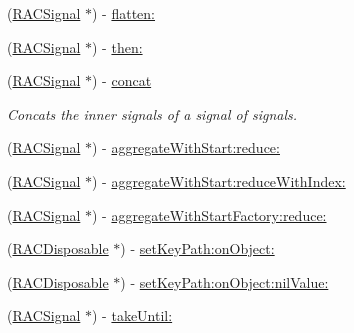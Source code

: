 \begin{DoxyCompactItemize}
\item 
(\mbox{\hyperlink{interface_r_a_c_signal}{R\+A\+C\+Signal}} $\ast$) -\/ \mbox{\hyperlink{category_r_a_c_signal_07_operations_08_a72e5f2fd80960ee5422e08ceef0f4e2c}{flatten\+:}}
\item 
(\mbox{\hyperlink{interface_r_a_c_signal}{R\+A\+C\+Signal}} $\ast$) -\/ \mbox{\hyperlink{category_r_a_c_signal_07_operations_08_aeed35de5a36e70f87721a0ad6ffabecd}{then\+:}}
\item 
\mbox{\label{category_r_a_c_signal_07_operations_08_a68bff1ad76f3dddda45dcf3dc98a1ae2}} 
(\mbox{\hyperlink{interface_r_a_c_signal}{R\+A\+C\+Signal}} $\ast$) -\/ \mbox{\hyperlink{category_r_a_c_signal_07_operations_08_a68bff1ad76f3dddda45dcf3dc98a1ae2}{concat}}
\begin{DoxyCompactList}\small\item\em Concats the inner signals of a signal of signals. \end{DoxyCompactList}\item 
(\mbox{\hyperlink{interface_r_a_c_signal}{R\+A\+C\+Signal}} $\ast$) -\/ \mbox{\hyperlink{category_r_a_c_signal_07_operations_08_a4b872b6c2322aa37f98282043e768582}{aggregate\+With\+Start\+:reduce\+:}}
\item 
(\mbox{\hyperlink{interface_r_a_c_signal}{R\+A\+C\+Signal}} $\ast$) -\/ \mbox{\hyperlink{category_r_a_c_signal_07_operations_08_a83c6fc367091505aa6721f1c6a58d65d}{aggregate\+With\+Start\+:reduce\+With\+Index\+:}}
\item 
(\mbox{\hyperlink{interface_r_a_c_signal}{R\+A\+C\+Signal}} $\ast$) -\/ \mbox{\hyperlink{category_r_a_c_signal_07_operations_08_a51c08c7a357f83c96c468a6aa13d4d87}{aggregate\+With\+Start\+Factory\+:reduce\+:}}
\item 
(\mbox{\hyperlink{interface_r_a_c_disposable}{R\+A\+C\+Disposable}} $\ast$) -\/ \mbox{\hyperlink{category_r_a_c_signal_07_operations_08_ada2a2f51a30fb8bef13819c50ebfbf85}{set\+Key\+Path\+:on\+Object\+:}}
\item 
(\mbox{\hyperlink{interface_r_a_c_disposable}{R\+A\+C\+Disposable}} $\ast$) -\/ \mbox{\hyperlink{category_r_a_c_signal_07_operations_08_a3d59cca19be3e985aa5a08cb0386faeb}{set\+Key\+Path\+:on\+Object\+:nil\+Value\+:}}
\item 
(\mbox{\hyperlink{interface_r_a_c_signal}{R\+A\+C\+Signal}} $\ast$) -\/ \mbox{\hyperlink{category_r_a_c_signal_07_operations_08_afb214e9e69dc34880b306c118b8e56d4}{take\+Until\+:}}
\item 

\end{DoxyCompactItemize}
